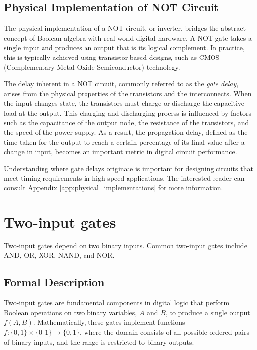 \subsection{Physical Implementation of NOT Circuit}
The physical implementation of a NOT circuit, or inverter, bridges the abstract concept of Boolean algebra with real-world digital hardware. A NOT gate takes a single input and produces an output that is its logical complement. In practice, this is typically achieved using transistor-based designs, such as CMOS (Complementary Metal-Oxide-Semiconductor) technology. 

The delay inherent in a NOT circuit, commonly referred to as the \emph{gate delay}, arises from the physical properties of the transistors and the interconnects. When the input changes state, the transistors must charge or discharge the capacitive load at the output. This charging and discharging process is influenced by factors such as the capacitance of the output node, the resistance of the transistors, and the speed of the power supply. As a result, the propagation delay, defined as the time taken for the output to reach a certain percentage of its final value after a change in input, becomes an important metric in digital circuit performance. 

Understanding where gate delays originate is important for designing circuits that meet timing requirements in high-speed applications. The interested reader can consult Appendix \ref{app:physical_implementations} for more information.

\section{Two-input gates}
Two-input gates depend on two binary inputs. Common two-input gates include AND, OR, XOR, NAND, and NOR. 

\subsection{Formal Description}
Two-input gates are fundamental components in digital logic that perform Boolean operations on two binary variables, \( A \) and \( B \), to produce a single output \( f(A, B) \). Mathematically, these gates implement functions \( f: \{0, 1\} \times \{0, 1\} \to \{0, 1\} \), where the domain consists of all possible ordered pairs of binary inputs, and the range is restricted to binary outputs. 

